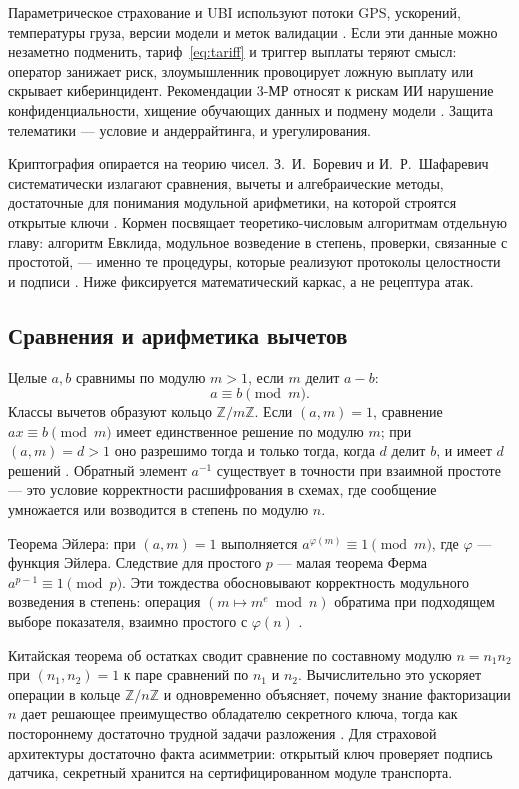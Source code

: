 \documentclass[a4paper,14pt]{extarticle}
\begin{document}
Параметрическое страхование и UBI используют потоки GPS, ускорений, температуры груза, версии модели и меток валидации \cite{maglinova, insurtech}. Если эти данные можно незаметно подменить, тариф~\eqref{eq:tariff} и триггер выплаты теряют смысл: оператор занижает риск, злоумышленник провоцирует ложную выплату или скрывает киберинцидент. Рекомендации 3-МР относят к рискам ИИ нарушение конфиденциальности, хищение обучающих данных и подмену модели \cite{cbr}. Защита телематики --- условие и андеррайтинга, и урегулирования.

Криптография опирается на теорию чисел. З.~И.~Боревич и И.~Р.~Шафаревич систематически излагают сравнения, вычеты и алгебраические методы, достаточные для понимания модульной арифметики, на которой строятся открытые ключи \cite{borevich}. Кормен посвящает теоретико-числовым алгоритмам отдельную главу: алгоритм Евклида, модульное возведение в степень, проверки, связанные с простотой, --- именно те процедуры, которые реализуют протоколы целостности и подписи \cite{cormen}. Ниже фиксируется математический каркас, а не рецептура атак.

\subsection{Сравнения и арифметика вычетов}

Целые $a,b$ сравнимы по модулю $m>1$, если $m$ делит $a-b$:
\begin{equation}
a\equiv b\pmod{m}.
\label{eq:cong}
\end{equation}
Классы вычетов образуют кольцо $\mathbb{Z}/m\mathbb{Z}$. Если $(a,m)=1$, сравнение $ax\equiv b\pmod{m}$ имеет единственное решение по модулю $m$; при $(a,m)=d>1$ оно разрешимо тогда и только тогда, когда $d$ делит $b$, и имеет $d$ решений \cite{borevich}. Обратный элемент $a^{-1}$ существует в точности при взаимной простоте --- это условие корректности расшифрования в схемах, где сообщение умножается или возводится в степень по модулю $n$.

Теорема Эйлера: при $(a,m)=1$ выполняется $a^{\varphi(m)}\equiv 1\pmod{m}$, где $\varphi$ --- функция Эйлера. Следствие для простого $p$ --- малая теорема Ферма $a^{p-1}\equiv 1\pmod{p}$. Эти тождества обосновывают корректность модульного возведения в степень: операция $(m\mapsto m^e\bmod n)$ обратима при подходящем выборе показателя, взаимно простого с $\varphi(n)$ \cite{borevich, cormen}.

Китайская теорема об остатках сводит сравнение по составному модулю $n=n_1 n_2$ при $(n_1,n_2)=1$ к паре сравнений по $n_1$ и $n_2$. Вычислительно это ускоряет операции в кольце $\mathbb{Z}/n\mathbb{Z}$ и одновременно объясняет, почему знание факторизации $n$ дает решающее преимущество обладателю секретного ключа, тогда как постороннему достаточно трудной задачи разложения \cite{borevich, cormen}. Для страховой архитектуры достаточно факта асимметрии: открытый ключ проверяет подпись датчика, секретный хранится на сертифицированном модуле транспорта.
\end{document}
